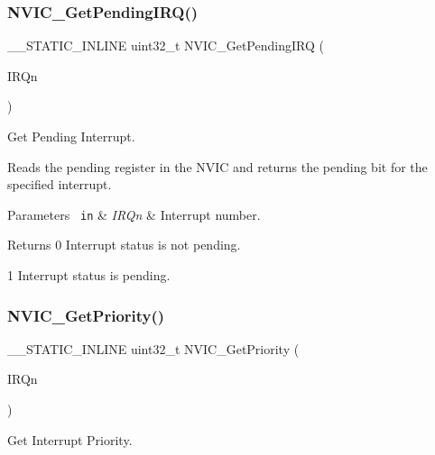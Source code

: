 \subsubsection{\texorpdfstring{NVIC\_GetPendingIRQ()}{NVIC\_GetPendingIRQ()}}
{\footnotesize\ttfamily \+\_\+\+\_\+\+S\+T\+A\+T\+I\+C\+\_\+\+I\+N\+L\+I\+NE uint32\+\_\+t N\+V\+I\+C\+\_\+\+Get\+Pending\+I\+RQ (\begin{DoxyParamCaption}\item[{\mbox{\hyperlink{group__SAME70J19__cmsis_gac3af4a32370fb28c4ade8bf2add80251}{I\+R\+Qn\+\_\+\+Type}}}]{I\+R\+Qn }\end{DoxyParamCaption})}



Get Pending Interrupt. 

Reads the pending register in the N\+V\+IC and returns the pending bit for the specified interrupt. 
\begin{DoxyParams}[1]{Parameters}
\mbox{\texttt{ in}}  & {\em I\+R\+Qn} & Interrupt number. \\
\hline
\end{DoxyParams}
\begin{DoxyReturn}{Returns}
0 Interrupt status is not pending. 

1 Interrupt status is pending. 
\end{DoxyReturn}
\mbox{\label{group__CMSIS__Core__NVICFunctions_ga1cbaf8e6abd4aa4885828e7f24fcfeb4}} 
\subsubsection{\texorpdfstring{NVIC\_GetPriority()}{NVIC\_GetPriority()}}
{\footnotesize\ttfamily \+\_\+\+\_\+\+S\+T\+A\+T\+I\+C\+\_\+\+I\+N\+L\+I\+NE uint32\+\_\+t N\+V\+I\+C\+\_\+\+Get\+Priority (\begin{DoxyParamCaption}\item[{\mbox{\hyperlink{group__SAME70J19__cmsis_gac3af4a32370fb28c4ade8bf2add80251}{I\+R\+Qn\+\_\+\+Type}}}]{I\+R\+Qn }\end{DoxyParamCaption})}



Get Interrupt Priority. 

